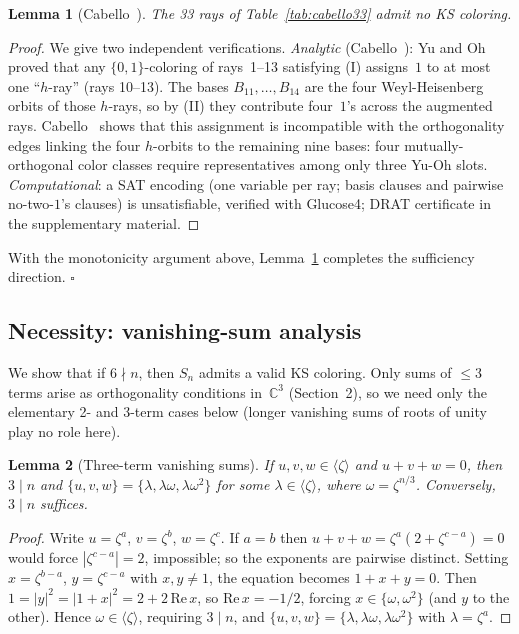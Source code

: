 \documentclass[twocolumn,prl,superscriptaddress,nofootinbib]{revtex4-2}
\newtheorem{lemma}{Lemma}
\newcommand{\C}{\mathbb{C}}
\begin{document}
\begin{lemma}[Cabello~\cite{Cabello2025simplest}]\label{lem:cabello33}
The 33 rays of Table~\ref{tab:cabello33} admit no KS coloring.
\end{lemma}

\begin{proof}[Proof]
We give two independent verifications.  \emph{Analytic} (Cabello~\cite{Cabello2025simplest}): Yu and Oh~\cite{YuOh2012} proved that any $\{0,1\}$-coloring of rays~1--13 satisfying (I) assigns~$1$ to at most one ``$h$-ray'' (rays 10--13).  The bases $B_{11}, \ldots, B_{14}$ are the four Weyl-Heisenberg orbits of those $h$-rays, so by (II) they contribute four~$1$'s across the augmented rays.  Cabello~\cite{Cabello2025simplest} shows that this assignment is incompatible with the orthogonality edges linking the four $h$-orbits to the remaining nine bases: four mutually-orthogonal color classes require representatives among only three Yu-Oh slots.  \emph{Computational}: a SAT encoding (one variable per ray; basis clauses and pairwise no-two-$1$'s clauses) is unsatisfiable, verified with Glucose4; DRAT certificate in the supplementary material. \qedhere
\end{proof}

With the monotonicity argument above, Lemma~\ref{lem:cabello33} completes the sufficiency direction. $\square$

\subsection{Necessity: vanishing-sum analysis}

We show that if $6 \nmid n$, then $S_n$ admits a valid KS coloring.  Only sums of $\leq 3$ terms arise as orthogonality conditions in~$\C^3$ (Section~2), so we need only the elementary 2- and 3-term cases below (longer vanishing sums of roots of unity~\cite{LamLeung2000} play no role here).

\begin{lemma}[Three-term vanishing sums]\label{lem:3term}
If $u, v, w \in \langle\zeta\rangle$ and $u + v + w = 0$, then $3 \mid n$ and $\{u, v, w\} = \{\lambda, \lambda\omega, \lambda\omega^2\}$ for some $\lambda \in \langle\zeta\rangle$, where $\omega = \zeta^{n/3}$.  Conversely, $3 \mid n$ suffices.
\end{lemma}

\begin{proof}
Write $u = \zeta^a$, $v = \zeta^b$, $w = \zeta^c$.  If $a = b$ then $u+v+w = \zeta^a(2 + \zeta^{c-a}) = 0$ would force $|\zeta^{c-a}| = 2$, impossible; so the exponents are pairwise distinct.  Setting $x = \zeta^{b-a}$, $y = \zeta^{c-a}$ with $x, y \neq 1$, the equation becomes $1 + x + y = 0$.  Then $1 = |y|^2 = |1+x|^2 = 2 + 2\,\mathrm{Re}\,x$, so $\mathrm{Re}\,x = -1/2$, forcing $x \in \{\omega, \omega^2\}$ (and $y$ to the other).  Hence $\omega \in \langle\zeta\rangle$, requiring $3 \mid n$, and $\{u,v,w\} = \{\lambda, \lambda\omega, \lambda\omega^2\}$ with $\lambda = \zeta^a$.
\end{proof}
\end{document}
